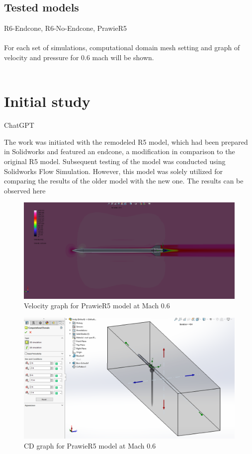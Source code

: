 \documentclass{article}
\begin{document}
\subsection{Tested models}
R6-Endcone, R6-No-Endcone, PrawieR5\\\\
For each set of simulations, computational domain mesh setting and graph of velocity and 
pressure for 0.6 mach will be shown.\\\\

\section{Initial study}
ChatGPT

The work was initiated with the remodeled R5 model, which had been prepared in Solidworks 
and featured an endcone, a modification in comparison to the original R5 model. Subsequent 
testing of the model was conducted using Solidworks Flow Simulation. However, this model 
was solely utilized for comparing the results of the older model with the new one. The 
results can be observed here

\begin{figure}[H]
    \centering
    \includegraphics[width=\textwidth]{../data/PrawieR5-Solid/PrawieR5-TR-Velocity-Mach06.png}
    \caption{Velocity graph for PrawieR5 model at Mach 0.6}
\end{figure}

\begin{figure}[H]
    \centering
    \includegraphics[width=\textwidth]{../data/PrawieR5-Solid/ComputationalDomain.png}
    \caption{CD graph for PrawieR5 model at Mach 0.6}
\end{figure}
\end{document}

